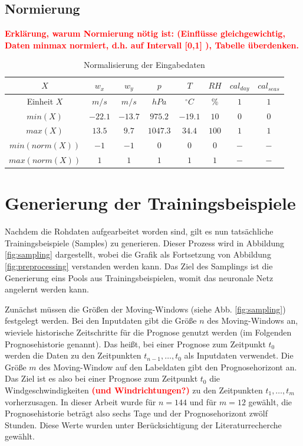 \documentclass[
12pt, %
toc=listofnumbered, %
toc=chapterentrydotfill, %
numbers=noenddot, %
captions=tableheading, %
bibliography=numbered
]{scrreprt}
\let\Oldsection\section
\renewcommand{\section}{\FloatBarrier\Oldsection}
\let\Oldsubsection\subsection
\renewcommand{\subsection}{\FloatBarrier\Oldsubsection}
\newcommand{\highlight}[1]{\textbf{\textcolor{red}{#1}}}
\begin{document}
\subsection{Normierung}

\highlight{Erklärung, warum Normierung nötig ist: (Einflüsse gleichgewichtig, Daten minmax normiert, d.h. auf Intervall [0,1] ), Tabelle überdenken.}

\begin{table}[ht]
	\centering
	\caption{Normalisierung der Eingabedaten}
	\begin{tabular}{|c|c|c|c|c|c|c|c|}
		\hline
		\rowcolor{color80}
		\textbf{$X$} & \textbf{$w_x$} & \textbf{$w_y$} & \textbf{$p$} & \textbf{$T$} & \textbf{$RH$} & \textbf{$cal_{day}$} & \textbf{$cal_{seas}$} \\ \hline
		Einheit $X$ & $m/s$ & $m/s$ & $hPa$ & $^\circ C$ & \% & $1$ & $1$ \\ \hline
		$min(X)$       & $-22.1$ & $-13.7$ & $975.2$ & $-19.1$ & $10$ & $0$ & $0$ \\ \hline
		$max(X)$       & $13.5$ & $9.7$ & $1047.3$ & $34.4$ & $100$ & $1$ & $1$ \\ \hline
		$min(norm(X))$ & $-1$ & $-1$ & $0$ & $0$ & $0$ & $-$ & $-$ \\ \hline
		$max(norm(X))$ & $1$ & $1$ & $1$ & $1$ & $1$ & $-$ & $-$ \\ \hline
	\end{tabular}
\label{tab:normalisierung}
\end{table}

\section{Generierung der Trainingsbeispiele}
Nachdem die Rohdaten aufgearbeitet worden sind, gilt es nun tatsächliche Trainingsbeispiele (Samples) zu generieren. Dieser Prozess wird in Abbildung \ref{fig:sampling} dargestellt, wobei die Grafik als Fortsetzung von Abbildung \ref{fig:preprocessing} verstanden werden kann. Das Ziel des Samplings ist die Generierung eins Pools aus Trainingsbeispielen, womit das neuronale Netz angelernt werden kann.

Zunächst müssen die Größen der Moving-Windows (siehe Abb. \ref{fig:sampling}) festgelegt werden. Bei den Inputdaten gibt die Größe $n$ des Moving-Windows an, wieviele historische Zeitschritte für die Prognose genutzt werden (im Folgenden Prognosehistorie genannt). Das heißt, bei einer Prognose zum Zeitpunkt $t_0$ werden die Daten zu den Zeitpunkten $t_{n-1}, \dots, t_0$ als Inputdaten verwendet. Die Größe $m$ des Moving-Window auf den Labeldaten gibt den Prognosehorizont an. Das Ziel ist es also bei einer Prognose zum Zeitpunkt $t_0$ die Windgeschwindigkeiten \highlight{(und Windrichtungen?)} zu den Zeitpunkten $t_1, \dots, t_m$ vorherzusagen. In dieser Arbeit wurde für $n=144$ und für $m=12$ gewählt, die Prognosehistorie beträgt also sechs Tage und der Prognosehorizont zwölf Stunden. Diese Werte wurden unter Berücksichtigung der Literaturrecherche gewählt.
\end{document}
